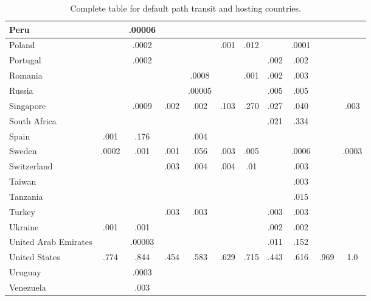 \begin{table*}[h!]
\begin{tabular}{|P{37mm}|cc|cc|cc|cc|cc|}
Peru             &     &.00006   &     &  &   &   &   &     &  & \\\hline
Poland             &    &.0002   &     &  &.001    &.012   &   &.0001     &  & \\\hline
Portugal             &    &.0002   &     &  &   &   &.002    &.002     &  & \\\hline
Romania             &     &   &     &.0008  &   &.001   &.002    &.003     &  & \\\hline
Russia             &    &  &     &.00005  &   &   &.005   &.005     &  & \\\hline
Singapore             &    &.0009   &.002     &.002  &.103    &.270   &.027    &.040     &  &.003 \\\hline
South Africa             &    &   &     &  &   &   &.021    &.334     &  & \\\hline
Spain             &.001     &.176   &    &.004  &   &   &   &     &  & \\\hline
Sweden             &.0002     &.001   &.001     &.056  &.003    &.005   &   &.0006     &  &.0003 \\\hline
Switzerland             &     &   &.003     &.004  &.004   &.01   &   &.003     &  & \\\hline
Taiwan             &     &   &     &  &   &  &    &.003     &  & \\\hline
Tanzania             &    &   &     &  &   &   &   &.015     &  & \\\hline
Turkey             &     &   &.003     &.003  &   &   &.003    &.003     &  & \\\hline
Ukraine             &.001     &.001   &     &  &    &   &.002    &.002     &  & \\\hline
United Arab Emirates             &     &.00003   &     &  &   &   &.011    &.152     &  & \\\hline
United States             &.774     &.844   &.454     &.583  &.629    &.715   &.443    &.616     &.969  &1.0 \\\hline
Uruguay             &     &.0003   &    &  &    &   &   &     &  & \\\hline
Venezuela             &    &.003   &     &  &   &   &   &     &  & \\\hline
\end{tabular}
\caption{Complete table for default path transit and hosting countries.}
\label{tab:complete_transit_host}
\end{table*}


